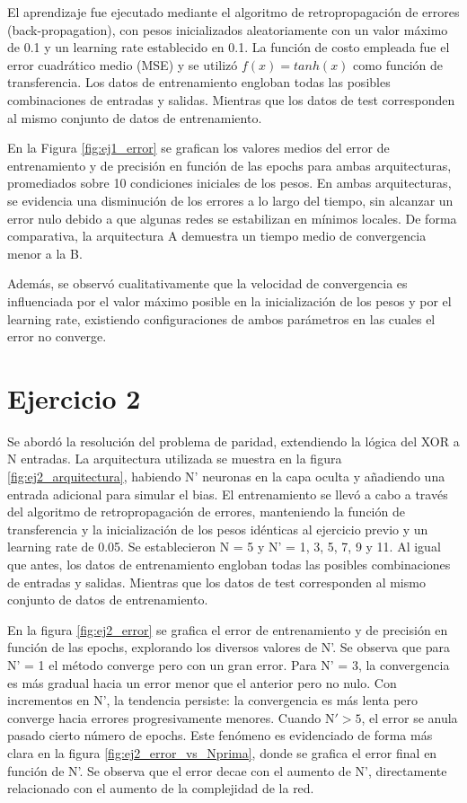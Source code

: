 \documentclass[aps,prb,twocolumn,superscriptaddress,floatfix,longbibliography]{revtex4-2}
\newcounter{para}
\begin{document}
El aprendizaje fue ejecutado mediante el algoritmo de retropropagación de errores (back-propagation), con pesos inicializados aleatoriamente con un valor máximo de 0.1 y un learning rate establecido en 0.1. La función de costo empleada fue el error cuadrático medio (MSE) y se utilizó $f(x) = tanh(x)$ como función de transferencia. Los datos de entrenamiento engloban todas las posibles combinaciones de entradas y salidas. Mientras que los datos de test corresponden al mismo conjunto de datos de entrenamiento.

En la Figura \ref{fig:ej1_error} se grafican los valores medios del error de entrenamiento y de precisión en función de las epochs para ambas arquitecturas, promediados sobre 10 condiciones iniciales de los pesos. En ambas arquitecturas, se evidencia una disminución de los errores a lo largo del tiempo, sin alcanzar un error nulo debido a que algunas redes se estabilizan en mínimos locales. De forma comparativa, la arquitectura A demuestra un tiempo medio de convergencia menor a la B.


Además, se observó cualitativamente que la velocidad de convergencia es influenciada por el valor máximo posible en la inicialización de los pesos y por el learning rate, existiendo configuraciones de ambos parámetros en las cuales el error no converge.

\section*{Ejercicio 2}



Se abordó la resolución del problema de paridad, extendiendo la lógica del XOR a N entradas. La arquitectura utilizada se muestra en la figura \ref{fig:ej2_arquitectura}, habiendo N' neuronas en la capa oculta y añadiendo una entrada adicional para simular el bias. El entrenamiento se llevó a cabo a través del algoritmo de retropropagación de errores, manteniendo la función de transferencia y la inicialización de los pesos idénticas al ejercicio previo y un learning rate de 0.05. Se establecieron N = 5 y N' = 1, 3, 5, 7, 9 y 11. Al igual que antes, los datos de entrenamiento engloban todas las posibles combinaciones de entradas y salidas. Mientras que los datos de test corresponden al mismo conjunto de datos de entrenamiento.


En la figura \ref{fig:ej2_error} se grafica el error de entrenamiento y de precisión en función de las epochs, explorando los diversos valores de N'. Se observa que para N' = 1 el método converge pero con un gran error. Para N' = 3, la convergencia es más gradual hacia un error menor que el anterior pero no nulo. Con incrementos en N', la tendencia persiste: la convergencia es más lenta pero converge hacia errores progresivamente menores. Cuando $\mathrm{N'} > 5$, el error se anula pasado cierto número de epochs. Este fenómeno es evidenciado de forma más clara en la figura \ref{fig:ej2_error_vs_Nprima}, donde se grafica el error final en función de N'. Se observa que el error decae con el aumento de N', directamente relacionado con el aumento de la complejidad de la red.
\end{document}
